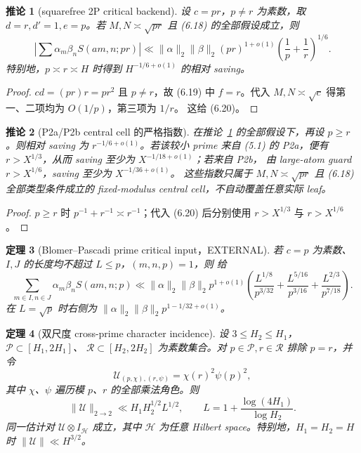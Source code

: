 \documentclass[11pt,a4paper]{ctexart}
\newtheorem{theorem}{定理}[section]
\newtheorem{corollary}[theorem]{推论}
\theoremstyle{definition}
\newcommand{\1}{\mathbf 1}
\newcommand{\EXTERNAL}{\textcolor{blue!70!black}{\textsf{EXTERNAL}}}
\begin{document}
\begin{corollary}[squarefree 2P critical backend]\label{cor:2p-fixed}
设 $c=pr$，$p\ne r$ 为素数，取 $d=r,d'=1,e=p$。若
$M,N\asymp\sqrt{pr}$ 且 (6.18) 的全部假设成立，则
\[
\left|\sum\alpha_m\beta_nS(am,n;pr)\right|
\ll \|\alpha\|_2\|\beta\|_2(pr)^{1+o(1)}
\left(\frac1p+\frac1r\right)^{1/6}.                 \tag{6.20}
\]
特别地，$p\asymp r\asymp H$ 时得到 $H^{-1/6+o(1)}$ 的相对 saving。
\end{corollary}

\begin{proof}
$cd=(pr)r=pr^2$ 且 $p\ne r$，故 (6.19) 中 $f=r$。代入
$M,N\asymp\sqrt c$ 得第一、二项均为 $O(1/p)$，第三项为 $1/r$。
这给 (6.20)。
\end{proof}

\begin{corollary}[P2a/P2b central cell 的严格指数]
在推论~\ref{cor:2p-fixed} 的全部假设下，再设 $p\ge r$。则相对 saving 为
$r^{-1/6+o(1)}$。若该较小 prime 来自 (5.1) 的 P2a，便有
$r>X^{1/3}$，从而 saving 至少为 $X^{-1/18+o(1)}$；若来自 P2b，
由 large-atom guard $r>X^{1/6}$，saving 至少为 $X^{-1/36+o(1)}$。
这些指数只属于 $M,N\asymp\sqrt{pr}$ 且 (6.18) 全部类型条件成立的
fixed-modulus central cell，不自动覆盖任意实际 leaf。
\end{corollary}

\begin{proof}
$p\ge r$ 时 $p^{-1}+r^{-1}\asymp r^{-1}$；代入 (6.20) 后分别使用
$r>X^{1/3}$ 与 $r>X^{1/6}$。
\end{proof}

\begin{theorem}[Blomer--Pascadi prime critical input，\EXTERNAL]
若 $c=p$ 为素数、$I,J$ 的长度均不超过 $L\le p$，$(m,n,p)=1$，则
\cite[Theorem 1.1]{BP2026} 给
\[
\sum_{m\in I,n\in J}\alpha_m\beta_nS(am,n;p)
\ll\|\alpha\|_2\|\beta\|_2p^{1+o(1)}
\left(\frac{L^{1/8}}{p^{3/32}}+
      \frac{L^{5/16}}{p^{3/16}}+
      \frac{L^{2/3}}{p^{7/18}}\right).               \tag{6.21}
\]
在 $L=\sqrt p$ 时右侧为
$\|\alpha\|_2\|\beta\|_2p^{1-1/32+o(1)}$。
\end{theorem}

\begin{theorem}[双尺度 cross-prime character incidence]\label{thm:cross-prime}
设 $3\le H_2\le H_1$，$\mathcal P\subset[H_1,2H_1]$、
$\mathcal R\subset[H_2,2H_2]$ 为素数集合。对
$p\in\mathcal P,r\in\mathcal R$ 排除 $p=r$，并令
\[
\mathscr U_{(p,\chi),(r,\psi)}=\chi(r)^2\psi(p)^2,   \tag{6.22}
\]
其中 $\chi$、$\psi$ 遍历模 $p$、$r$ 的全部乘法角色。则
\[
\boxed{\|\mathscr U\|_{2\to2}
\ll H_1H_2^{1/2}L^{1/2}},\qquad
L=1+\frac{\log(4H_1)}{\log H_2}.                    \tag{6.23}
\]
同一估计对 $\mathscr U\otimes I_{\mathcal H}$ 成立，其中 $\mathcal H$
为任意 Hilbert space。特别地，$H_1=H_2=H$ 时
$\|\mathscr U\|\ll H^{3/2}$。
\end{theorem}
\end{document}
